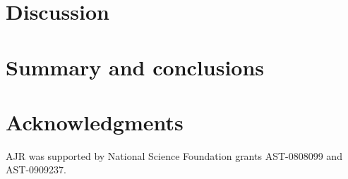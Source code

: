 \documentclass[useAMS,usenatbib]{mn2e}
\begin{document}
\section{Discussion}
\label{sec:discussion}

\section{Summary and conclusions}
\label{sec:conclusions}


\section*{Acknowledgments}

AJR was supported by National Science Foundation grants AST-0808099
and AST-0909237.




\appendix
\end{document}
